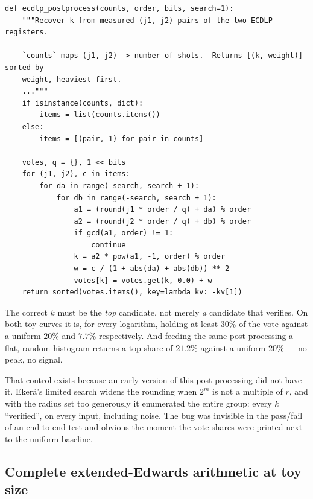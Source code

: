 \documentclass[11pt]{article}
\theoremstyle{plain}
\theoremstyle{remark}
\begin{document}
\begin{lstlisting}
def ecdlp_postprocess(counts, order, bits, search=1):
    """Recover k from measured (j1, j2) pairs of the two ECDLP registers.

    `counts` maps (j1, j2) -> number of shots.  Returns [(k, weight)] sorted by
    weight, heaviest first.
    ..."""
    if isinstance(counts, dict):
        items = list(counts.items())
    else:
        items = [(pair, 1) for pair in counts]

    votes, q = {}, 1 << bits
    for (j1, j2), c in items:
        for da in range(-search, search + 1):
            for db in range(-search, search + 1):
                a1 = (round(j1 * order / q) + da) % order
                a2 = (round(j2 * order / q) + db) % order
                if gcd(a1, order) != 1:
                    continue
                k = a2 * pow(a1, -1, order) % order
                w = c / (1 + abs(da) + abs(db)) ** 2
                votes[k] = votes.get(k, 0.0) + w
    return sorted(votes.items(), key=lambda kv: -kv[1])
\end{lstlisting}

\begin{warnbox}[title={The control that catches a broken circuit}]
The correct $k$ must be the \emph{top} candidate, not merely \emph{a} candidate that verifies. On
both toy curves it is, for every logarithm, holding at least $30\%$ of the vote against a uniform
$20\%$ and $7.7\%$ respectively. And feeding the same post-processing a flat, random histogram
returns a top share of $21.2\%$ against a uniform $20\%$ --- no peak, no signal.

That control exists because an early version of this post-processing did not have it. Eker\aa{}'s
limited search \cite{ec:ekera} widens the rounding when $2^m$ is not a multiple of $r$, and with the
radius set too generously it enumerated the entire group: every $k$ ``verified'', on every input,
including noise. The bug was invisible in the pass/fail of an end-to-end test and obvious the
moment the vote shares were printed next to the uniform baseline.
\end{warnbox}

\subsection{Complete extended-Edwards arithmetic at toy size}
\label{ec:sec:edwards-toy}
\end{document}

